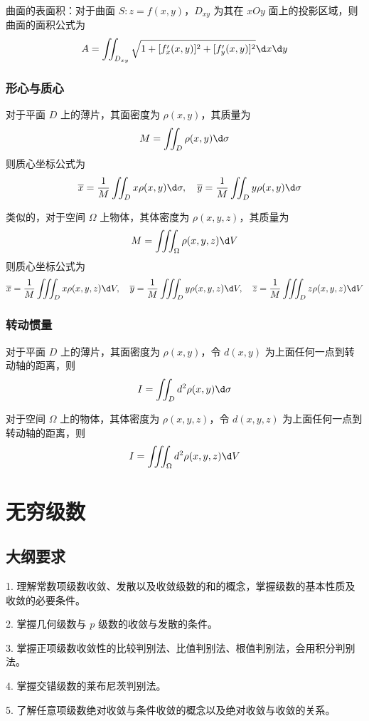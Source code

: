 曲面的表面积：对于曲面 $S: z = f(x,y)$，$D_{xy}$ 为其在 $xOy$ 面上的投影区域，则曲面的面积公式为
\[ A = \iint_{D_{xy}} \sqrt{ 1 + [f_x'(x,y)]^2 + [f_y'(x,y)]^2 } \d x \d y \]


\subsubsection*{形心与质心}

对于平面 $D$ 上的薄片，其面密度为 $\rho(x, y)$，其质量为
\[ M = \iint_D \rho(x,y) \d \sigma \]
则质心坐标公式为
\[ \quad \overline{x} = \frac{1}{M}\iint_D x \rho(x,y) \d \sigma, \quad \overline{y} =\frac{1}{M}\iint_D y \rho(x,y) \d \sigma \]

类似的，对于空间 $\Omega$ 上物体，其体密度为 $\rho(x, y, z)$，其质量为
\[ M = \iiint_\Omega \rho(x,y,z) \d V \]
则质心坐标公式为
\[ \overline{x} = \frac{1}{M}\iiint_D x \rho(x,y,z) \d V, \quad \overline{y} = \frac{1}{M}\iiint_D y \rho(x,y,z) \d V, \quad \overline{z} = \frac{1}{M}\iiint_D z \rho(x,y,z) \d V \]

\subsubsection*{转动惯量}

对于平面 $D$ 上的薄片，其面密度为 $\rho(x, y)$，令 $d(x,y)$ 为上面任何一点到转动轴的距离，则
\[ I = \iint_D d^2 \rho(x, y) \d \sigma \]

对于空间 $\Omega$ 上的物体，其体密度为 $\rho(x, y, z)$，令 $d(x,y,z)$ 为上面任何一点到转动轴的距离，则
\[ I = \iiint_\Omega d^2 \rho(x, y, z) \d V \]

\section{无穷级数}

\subsection{大纲要求}

1. 理解常数项级数收敛、发散以及收敛级数的和的概念，掌握级数的基本性质及收敛的必要条件。

2. 掌握几何级数与 $p$ 级数的收敛与发散的条件。

3. 掌握正项级数收敛性的比较判别法、比值判别法、根值判别法，会用积分判别法。

4. 掌握交错级数的莱布尼茨判别法。

5. 了解任意项级数绝对收敛与条件收敛的概念以及绝对收敛与收敛的关系。

